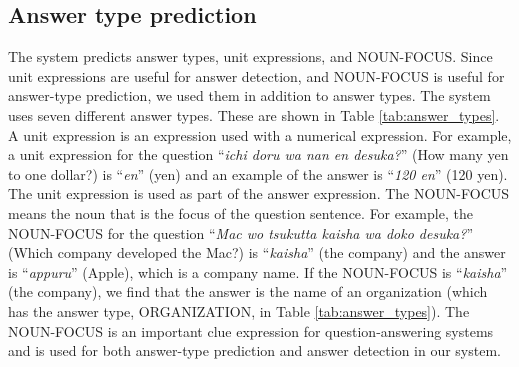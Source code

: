\subsection{Answer type prediction}
\label{sec:expectation}

The system predicts answer types, 
unit expressions, and NOUN-FOCUS. 
Since unit expressions are useful for answer detection, and 
NOUN-FOCUS is useful for answer-type prediction, 
we used them in addition to answer types. 
The system uses seven different answer types. 
These are shown in Table \ref{tab:answer_types}.
A unit expression is an expression used with 
a numerical expression. For example, 
a unit expression for the question 
``{\it ichi doru wa nan en desuka?}'' (How many yen to one dollar?) 
is ``{\it en}'' (yen) and 
an example of the answer is ``{\it 120 en}'' (120 yen). 
The unit expression is used as part of the answer expression. 
The NOUN-FOCUS means the noun that is the focus of the question sentence. 
For example, 
the NOUN-FOCUS for the question 
``{\it Mac wo tsukutta kaisha wa doko desuka?}'' (Which company 
developed the Mac?) 
is ``{\it kaisha}'' (the company) and 
the answer is ``{\it appuru}'' (Apple), which is a company name. 
If the NOUN-FOCUS is ``{\it kaisha}'' (the company), 
we find that the answer is the name of an organization (which has the answer type, ORGANIZATION, in Table \ref{tab:answer_types}). 
The NOUN-FOCUS is an important clue expression for question-answering systems 
and is used for both answer-type prediction 
and answer detection in our system. 


